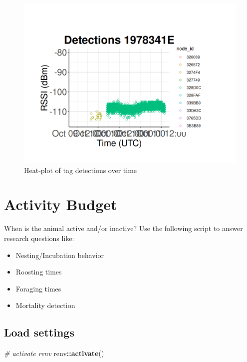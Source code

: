 \documentclass[
]{book}
\newenvironment{Shaded}{\begin{snugshade}}{\end{snugshade}}
\newcommand{\CommentTok}[1]{\textcolor[rgb]{0.56,0.35,0.01}{\textit{#1}}}
\newcommand{\FunctionTok}[1]{\textcolor[rgb]{0.13,0.29,0.53}{\textbf{#1}}}
\newcommand{\NormalTok}[1]{#1}
\newcommand{\SpecialCharTok}[1]{\textcolor[rgb]{0.81,0.36,0.00}{\textbf{#1}}}
\providecommand{\tightlist}{%
  \setlength{\itemsep}{0pt}\setlength{\parskip}{0pt}}
\begin{document}
\begin{figure}
\centering
\includegraphics{images/presence_absence_detections_over_time_specific_tag.png}
\caption{Heat-plot of tag detections over time}
\end{figure}

\chapter{Activity Budget}\label{activity-budget}

When is the animal active and/or inactive? Use the following script to answer research questions like:

\begin{itemize}
\tightlist
\item
  Nesting/Incubation behavior
\item
  Roosting times
\item
  Foraging times
\item
  Mortality detection
\end{itemize}

\section{Load settings}\label{load-settings-1}

\begin{Shaded}
\begin{Highlighting}[]
\CommentTok{\# activate renv}
\NormalTok{renv}\SpecialCharTok{::}\FunctionTok{activate}\NormalTok{()}
\end{Highlighting}
\end{Shaded}
\end{document}
